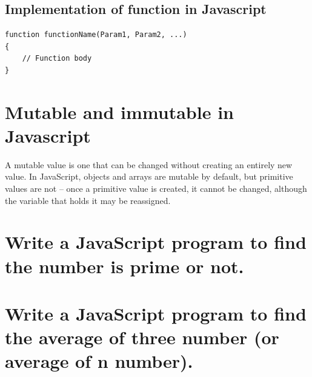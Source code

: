 \documentclass[twocolumn, a4paper]{article}
\begin{document}
\subsection{Implementation of function in Javascript}
\begin{small}
\begin{verbatim}
function functionName(Param1, Param2, ...)
{
    // Function body
}
\end{verbatim}
\end{small}

\section{Mutable and immutable in Javascript}
A mutable value is one that can be changed without creating an entirely new
value. In JavaScript, objects and arrays are mutable by default, but primitive
values are not -- once a primitive value is created, it cannot be changed,
although the variable that holds it may be reassigned.



\pagebreak
\onecolumn
\section{Write a JavaScript program to find the number is prime or not.}
\section{Write a JavaScript program to find the average of three number (or
average of n number).}
\end{document}

